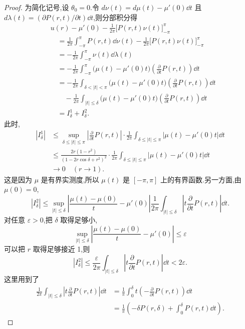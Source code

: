 \begin{proof}
为简化记号,设 $\theta_{0} = 0$.令 $d\nu(t) = d\mu(t) - \mu'(0)\dd t$ 且 $d\lambda(t) = (\partial P(r, t)/\partial t)\dd t$,则分部积分得
\begin{align*}
& u(r) - \mu'(0) - \frac{1}{2\pi}\bigl[P(r, t)\nu(t)\bigr]_{-\pi}^{\pi} \\
& \quad = \frac{1}{2\pi}\int_{-\pi}^{\pi}P(r, t)\dd\nu(t) - \frac{1}{2\pi}\bigl[P(r, t)\nu(t)\bigr]_{-\pi}^{\pi} \\
& \quad = -\frac{1}{2\pi}\int_{-\pi}^{\pi}\nu(t)\dd\lambda(t) \\
& \quad = -\frac{1}{2\pi}\int_{-\pi}^{\pi}\bigl(\mu(t) - \mu'(0)t\bigr)\left(\frac{\partial}{\partial t}P(r, t)\right)\dd t \\
& \quad = -\frac{1}{2\pi}\int_{\delta < |t| < \pi}\bigl(\mu(t) - \mu'(0)t\bigr)\left(\frac{\partial}{\partial t}P(r, t)\right)\dd t \\
& \qquad - \frac{1}{2\pi}\int_{|t| \leq \delta}\bigl(\mu(t) - \mu'(0)t\bigr)\left(\frac{\partial}{\partial t}P(r, t)\right)\dd t \\
& \quad = I_{\delta}^{1} + I_{\delta}^{2}.
\end{align*}
此时,
\begin{align*}
|I_{\delta}^{1}| &\leq \sup_{\delta \leq |t| \leq \pi}\left|\frac{\partial}{\partial t}P(r, t)\right| \cdot \frac{1}{2\pi}\int_{\delta \leq |t| \leq \pi}|\mu(t) - \mu'(0)t|\dd t \\
\quad &\leq \frac{2r(1 - r^{2})}{(1 - 2r\cos\delta + r^{2})^{2}} \cdot \frac{1}{2\pi}\int_{\delta \leq |t| \leq \pi}|\mu(t) - \mu'(0)t|\dd t \\
\quad &\rightarrow 0 \quad (r \rightarrow 1).
\end{align*}
这是因为 $\mu$ 是有界实测度,所以 $\mu(t)$ 是 $[-\pi, \pi]$ 上的有界函数.另一方面,由 $\mu(0) = 0$,
\begin{equation*}
|I_{\delta}^{2}| \leq \sup_{|t| \leq \delta}\left|\frac{\mu(t) - \mu(0)}{t} - \mu'(0)\right|\frac{1}{2\pi}\int_{|t| \leq \delta}\left|t\frac{\partial}{\partial t}P(r, t)\right|\dd t.
\end{equation*}
对任意 $\varepsilon > 0$,把 $\delta$ 取得足够小,
\begin{equation*}
\sup_{|t| \leq \delta}\left|\frac{\mu(t) - \mu(0)}{t} - \mu'(0)\right| \leq \varepsilon
\end{equation*}
可以把 $r$ 取得足够接近 1,则
\begin{equation*}
|I_{\delta}^{2}| \leq \frac{\varepsilon}{2\pi}\int_{|t| \leq \delta}\left|t\frac{\partial}{\partial t}P(r, t)\right|\dd t < 2\varepsilon.
\end{equation*}
这里用到了
\begin{align*}
\frac{1}{2\pi}\int_{|t| \leq \delta}\left|t\frac{\partial}{\partial t}P(r, t)\right|\dd t & = \frac{1}{\pi}\int_{0}^{\delta}t\left(-\frac{\partial}{\partial t}P(r, t)\right)\dd t \\
& = \frac{1}{\pi}\left(-\delta P(r, \delta) + \int_{0}^{\delta}P(r, t)\dd t\right).
\end{align*}


\end{proof}
